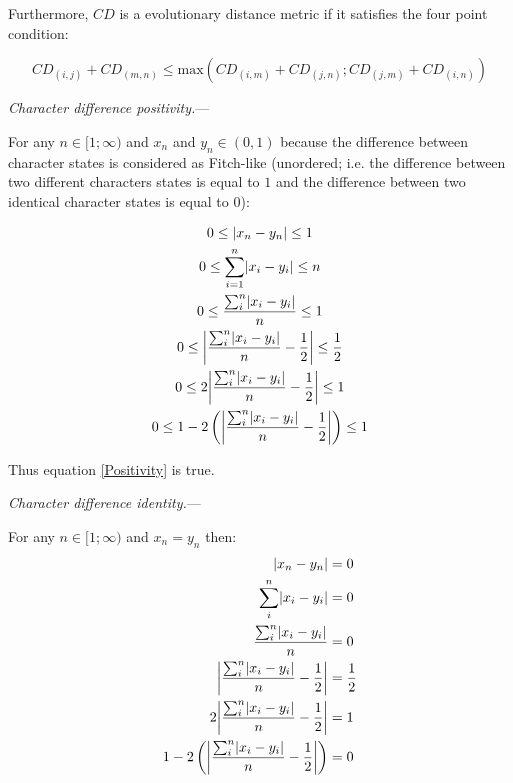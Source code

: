 \documentclass[12pt,letterpaper]{article}
\DeclarePairedDelimiter\abs{\lvert}{\rvert}%
\renewcommand{\subsection}[1]{%
\bigskip
\begin{center}
\begin{large}
\normalfont\itshape #1
\end{large}
\end{center}}
\renewcommand{\subsection}[1]{%
\vspace{2ex}
\noindent
\textit{#1.}---}
\begin{document}
\noindent Furthermore, $CD$ is a evolutionary distance metric if it satisfies the four point condition:

\begin{equation}
    \label{fourpoint}
    CD_{(i,j)} + CD_{(m,n)} \leq \text{max}{(CD_{(i,m)} + CD_{(j,n)} ; CD_{(j,m)} + CD_{(i,n)} )}
\end{equation}

\newpage

\subsection{Character difference positivity}

For any $n \in [1;\infty)$ and $x_{n}$ and $y_{n} \in (0,1)$ because the difference between character states is considered as Fitch-like (unordered; i.e. the difference between two different characters states is equal to $1$ and the difference between two identical character states is equal to $0$):

\begin{equation}
    \label{positive_demo}
    \begin{gathered}
    0 \leq  \abs{x_{n}-y_{n}} \leq 1\\
    0 \leq  \sum_{i=1}^{n}\abs{x_{i}-y_{i}} \leq n\\
    0 \leq  \frac{\sum_{i}^{n}\abs{x_{i}-y_{i}}}{n} \leq 1\\
    0 \leq  \abs*{\frac{\sum_{i}^{n}\abs{x_{i}-y_{i}}}{n}-\frac{1}{2}} \leq \frac{1}{2}\\
    0 \leq  2\abs*{\frac{\sum_{i}^{n}\abs{x_{i}-y_{i}}}{n}-\frac{1}{2}} \leq 1\\
    0 \leq  1 - 2\left(\abs*{\frac{\sum_{i}^{n}\abs{x_{i}-y_{i}}}{n}-\frac{1}{2}}\right) \leq 1\\
    \end{gathered}
\end{equation}

Thus equation \ref{Positivity} is true.

\newpage

\subsection{Character difference identity}

For any $n \in [1;\infty)$ and $x_{n} = y_{n}$ then:
\begin{equation}
    \label{identitydemo}
    \begin{aligned}
    \abs{x_{n}-y_{n}} &= 0\\
    \sum_{i}^{n}\abs{x_{i}-y_{i}} &= 0\\
    \frac{\sum_{i}^{n}\abs{x_{i}-y_{i}}}{n} &= 0\\
    \abs*{\frac{\sum_{i}^{n}\abs{x_{i}-y_{i}}}{n}-\frac{1}{2}} &= \frac{1}{2}\\
    2\abs*{\frac{\sum_{i}^{n}\abs{x_{i}-y_{i}}}{n}-\frac{1}{2}} &= 1\\
    1 - 2\left(\abs*{\frac{\sum_{i}^{n}\abs{x_{i}-y_{i}}}{n}-\frac{1}{2}}\right) &= 0\\
    \end{aligned}
\end{equation}
\end{document}
